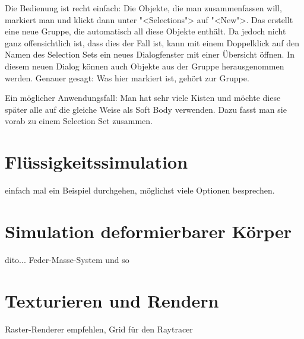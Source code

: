 \documentclass[12pt,a4paper]{scrartcl}
\begin{document}
Die Bedienung ist recht einfach: Die Objekte, die man zusammenfassen
will, markiert man und klickt dann unter "<Selections"> auf "<New">. Das
erstellt eine neue Gruppe, die automatisch all diese Objekte enthält. Da
jedoch nicht ganz offensichtlich ist, dass dies der Fall ist, kann mit
einem Doppelklick auf den Namen des Selection Sets ein neues
Dialogfenster mit einer Übersicht öffnen. In diesem neuen Dialog können
auch Objekte aus der Gruppe herausgenommen werden. Genauer gesagt: Was
hier markiert ist, gehört zur Gruppe.

Ein möglicher Anwendungsfall: Man hat sehr viele Kisten und möchte diese
später alle auf die gleiche Weise als Soft Body verwenden. Dazu fasst
man sie vorab zu einem Selection Set zusammen.


\pagebreak
\section{Flüssigkeitssimulation}
einfach mal ein Beispiel durchgehen, möglichst viele Optionen
besprechen.


\pagebreak
\section{Simulation deformierbarer Körper}
dito... Feder-Masse-System und so


\pagebreak
\section{Texturieren und Rendern}
Raster-Renderer empfehlen, Grid für den Raytracer
\end{document}
